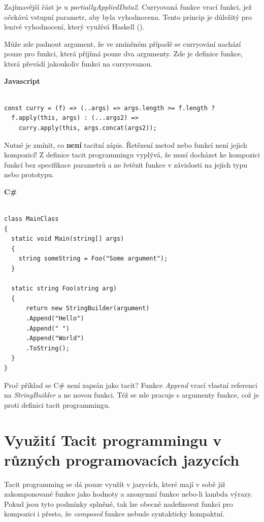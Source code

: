 \documentclass[male,czech]{kithesis}
\begin{document}
Zajímavější část je u \textit{partiallyAppliedData2}. 
Curryovaná funkce vrací funkci, 
jež očekává vstupní parametr, 
aby byla vyhodnocena. 
Tento princip je důležitý
pro lenivé vyhodnocení, 
který využívá Haskell (\cite{HaskellCurrying}).

Může zde padnout argument, 
že ve zmíněném případě se curryování nachází pouze pro funkci,
která přijímá pouze dva argumenty. 
Zde je definice funkce, 
která převádí jakoukoliv funkci na curryovanou.

\textbf{Javascript}
\begin{verbatim}

const curry = (f) => (..args) => args.length >= f.length ? 
  f.apply(this, args) : (...args2) => 
    curry.apply(this, args.concat(args2));

\end{verbatim}

Nutné je zmínit, 
co \textbf{není} tacitní zápis. 
Řetězení metod nebo funkcí není jejich kompozicí!
Z definice tacit programmingu vyplývá,
že musí docházet ke kompozici funkcí bez specifikace parametrů a
ne řetězit funkce v závislosti na jejich typu nebo prototypu.

\textbf{C\#}
\begin{verbatim}

class MainClass 
{
  static void Main(string[] args)
  {
    string someString = Foo("Some argument");
  }

  static string Foo(string arg)
  {
      return new StringBuilder(argument)
      .Append("Hello")
      .Append(" ")
      .Append("World")
      .ToString();
  }
}

\end{verbatim}

Proč příklad se C\# není zapsán jako tacit? 
Funkce \textit{Append} vrací vlastní referenci na \textit{StringBuilder} a 
ne novou funkci. 
Též se zde pracuje s argumenty funkce, 
což je proti definici tacit programmingu.

\section{Využití Tacit programmingu v různých programovacích jazycích}

Tacit programming se dá pouze využít v jazycích,
které mají v sobě již zakomponované funkce jako hodnoty a
anonymní funkce nebo-li lambda výrazy.
Pokud jsou tyto podmínky splněné, 
tak lze obecně nadefinovat funkci pro kompozici i přesto,
že \textit{composed} funkce nebude syntakticky kompaktní.
\end{document}
